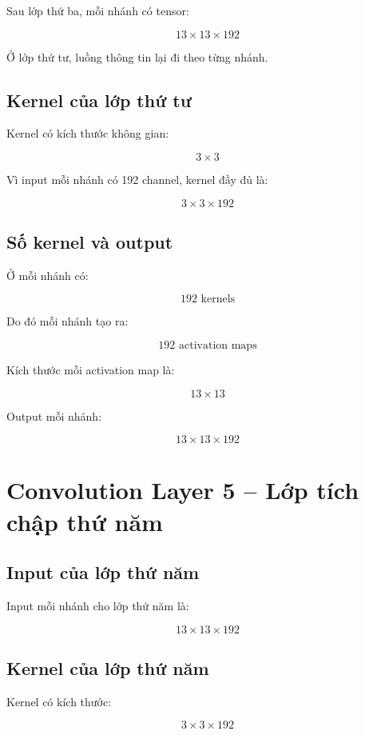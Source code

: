 Sau lớp thứ ba, mỗi nhánh có tensor:

\[
    13\times13\times192
\]

Ở lớp thứ tư, luồng thông tin lại đi theo từng nhánh.

\subsection{Kernel của lớp thứ tư}

Kernel có kích thước không gian:

\[
    3\times3
\]

Vì input mỗi nhánh có 192 channel, kernel đầy đủ là:

\[
    3\times3\times192
\]

\subsection{Số kernel và output}

Ở mỗi nhánh có:

\[
    192 \text{ kernels}
\]

Do đó mỗi nhánh tạo ra:

\[
    192 \text{ activation maps}
\]

Kích thước mỗi activation map là:

\[
    13\times13
\]

Output mỗi nhánh:

\[
    13\times13\times192
\]

\section{Convolution Layer 5 -- Lớp tích chập thứ năm}

\subsection{Input của lớp thứ năm}

Input mỗi nhánh cho lớp thứ năm là:

\[
    13\times13\times192
\]

\subsection{Kernel của lớp thứ năm}

Kernel có kích thước:

\[
    3\times3\times192
\]

